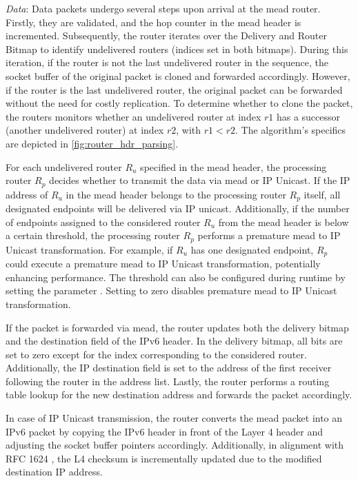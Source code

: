 \textit{Data}: Data packets undergo several steps upon arrival at the \gls{mead}
    router.
Firstly, they are validated, and the hop counter in the \gls{mead} header is
    incremented.
Subsequently, the router iterates over the Delivery and Router Bitmap to
    identify undelivered routers (indices set in both bitmaps).
During this iteration, if the router is not the last undelivered router in the
    sequence, the socket buffer of the original packet is cloned and forwarded
    accordingly.
However, if the router is the last undelivered router, the original packet can
    be forwarded without the need for costly replication.
To determine whether to clone the packet, the routers monitors whether an 
    undelivered router at index $r1$ has a successor (another undelivered
    router) at index $r2$, with $r1 < r2$.
The algorithm's specifics are depicted in \autoref{fig:router_hdr_parsing}.

For each undelivered router $R_u$ specified in the \gls{mead} header, the
    processing router $R_p$ decides whether to transmit the data via \gls{mead}
    or IP Unicast.
If the IP address of $R_u$ in the \gls{mead} header belongs to the processing
    router $R_p$ itself, all designated endpoints will be delivered via IP
    unicast.
Additionally, if the number of endpoints assigned to the considered router
    $R_u$ from the \gls{mead} header is below a certain threshold, the processing
    router $R_p$ performs a premature \gls{mead} to IP Unicast transformation.
For example, if $R_u$ has one designated endpoint, $R_p$ could execute a
    premature \gls{mead} to IP Unicast transformation, potentially enhancing
    performance.
The threshold can also be configured during runtime by setting the parameter
    .
Setting  to zero disables premature \gls{mead} to IP Unicast
    transformation.

If the packet is forwarded via \gls{mead}, the router updates both the delivery
    bitmap and the destination field of the IPv6 header.
In the delivery bitmap, all bits are set to zero except for the index
    corresponding to the considered router.
Additionally, the IP destination field is set to the address of the first
    receiver following the router in the address list.
Lastly, the router performs a routing table lookup for the new destination
    address and forwards the packet accordingly.

In case of IP Unicast transmission, the router converts the \gls{mead} packet
    into an IPv6 packet by copying the IPv6 header in front of the Layer 4
    header and adjusting the socket buffer pointers accordingly.
Additionally, in alignment with RFC 1624 \cite{rfc1624}, the L4 checksum is
    incrementally updated due to the modified destination IP address.

